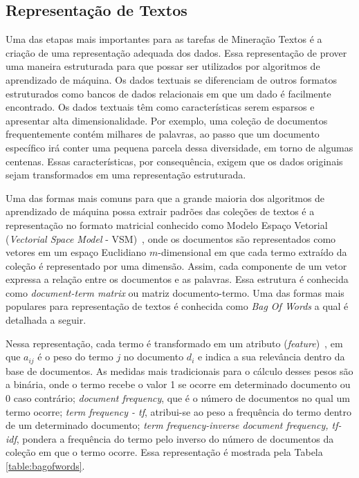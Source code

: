 \subsection{Representação de Textos} \label{section:RepTextos}

Uma das etapas mais importantes para as tarefas de Mineração Textos é a criação de uma representação adequada dos dados. Essa representação de prover uma maneira estruturada para que possar ser utilizados por algoritmos de aprendizado de máquina. Os dados textuais se diferenciam de outros formatos estruturados como bancos de dados relacionais em que um dado é facilmente encontrado. Os dados textuais têm como características serem esparsos e apresentar alta dimensionalidade. Por exemplo, uma coleção de documentos frequentemente contém milhares de palavras, ao passo que um documento específico irá conter uma pequena parcela dessa diversidade, em torno de algumas centenas. Essas características, por consequência, exigem que os dados originais sejam transformados em uma representação estruturada.


Uma das formas mais comuns para que a grande maioria dos algoritmos de aprendizado de máquina possa extrair padrões das coleções de textos é a representação no formato matricial conhecido como Modelo Espaço Vetorial (\textit{Vectorial Space Model} - VSM)~\cite{Rezende2003}, onde os documentos são representados como vetores em um espaço Euclidiano $m$-dimensional em que cada termo extraído da coleção é representado por uma dimensão. Assim, cada componente de um vetor expressa a relação entre os documentos e as palavras. Essa estrutura é conhecida como \textit{document-term matrix} ou matriz documento-termo. Uma das formas mais populares para representação de textos é conhecida como \textit{Bag Of Words} a qual é detalhada a seguir.
	

		
Nessa representação, cada termo é transformado em um atributo  (\textit{feature})~\cite{Rezende2003}, em que $a_{ij}$ é o peso do termo $j$ no documento $d_i$ e indica a sua relevância dentro da base de documentos. As medidas mais tradicionais para o cálculo desses pesos são a binária, onde o termo recebe o valor 1 se ocorre em determinado documento ou 0 caso contrário; \textit{document frequency}, que é o número de documentos no qual um termo ocorre; \textit{term frequency - tf}, atribui-se ao peso a frequência do termo dentro de um determinado documento; \textit{term frequency-inverse document frequency, tf-idf}, pondera a frequência do termo pelo inverso do número de documentos da coleção em que o termo ocorre.
Essa representação é mostrada pela Tabela \ref{table:bagofwords}.

